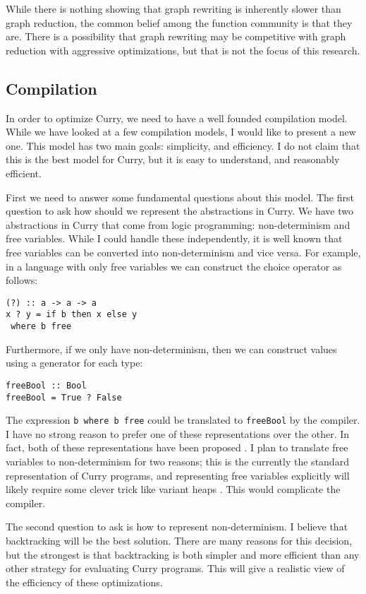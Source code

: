 While there is nothing showing that graph rewriting is inherently slower than graph reduction,
the common belief among the function community is that they are.
There is a possibility that graph rewriting may be competitive with graph reduction
with aggressive optimizations, but that is not the focus of this research.

\subsection{Compilation}
In order to optimize Curry, we need to have a well founded compilation model.
While we have looked at a few compilation models, I would like to present a new one.
This model has two main goals: simplicity, and efficiency.
I do not claim that this is the best model for Curry, but it is easy to understand, and reasonably efficient.

First we need to answer some fundamental questions about this model.
The first question to ask how should we represent the abstractions in Curry.
We have two abstractions in Curry that come from logic programming:
non-determinism and free variables.
While I could handle these independently, it is well known that free variables can be converted into
non-determinism and vice versa.
For example, in a language with only free variables we can construct the choice operator as follows:
\begin{verbatim}
(?) :: a -> a -> a
x ? y = if b then x else y
 where b free
\end{verbatim}
Furthermore, if we only have non-determinism, then we can construct values using a generator for each type:
\begin{verbatim}
freeBool :: Bool
freeBool = True ? False
\end{verbatim}
The expression \texttt{b where b free} could be translated to \texttt{freeBool} by the compiler.
I have no strong reason to prefer one of these representations over the other.
In fact, both of these representations have been proposed \cite{andrew, kics2}.
I plan to translate free variables to non-determinism for two reasons;
this is the currently the standard representation of Curry programs, and representing free variables explicitly
will likely require some clever trick like variant heaps \cite{andrew}.
This would complicate the compiler.

The second question to ask is how to represent non-determinism.
I believe that backtracking will be the best solution.
There are many reasons for this decision, but the strongest is that backtracking
is both simpler and more efficient than any other strategy for evaluating Curry programs.
This will give a realistic view of the efficiency of these optimizations.

